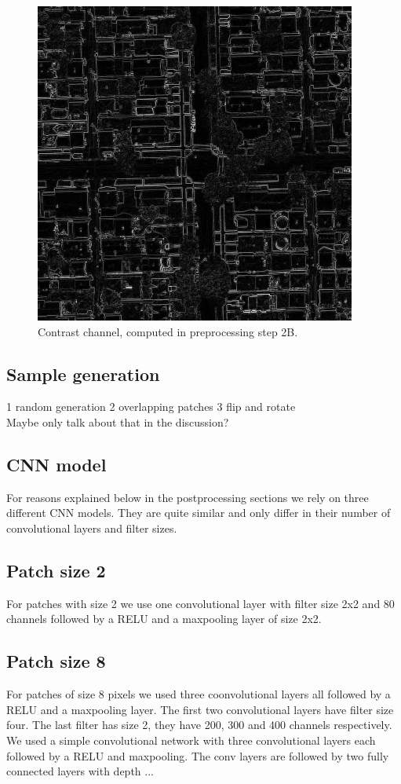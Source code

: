 \documentclass[10pt,conference,compsocconf]{IEEEtran}
\begin{document}
\begin{figure}
	\centering
	\includegraphics[width=.5\columnwidth]{pictures/preproc2}
	\caption{Contrast channel, computed in preprocessing step 2B.}
	\label{fig:preproc_simple}
\end{figure}

\subsection{Sample generation}
1 random generation
2 overlapping patches
3 flip and rotate\\
Maybe only talk about that in the discussion?

\subsection{CNN model}
For reasons explained below in the postprocessing sections we rely on three different CNN models. They are quite similar and only differ in their number of convolutional layers and filter sizes. 
\subsection{Patch size 2}
	For patches with size 2 we use one convolutional layer with filter size 2x2 and 80 channels followed by a RELU and a maxpooling layer of size 2x2. 
\subsection{Patch size 8}
	For patches of size 8 pixels we used three coonvolutional layers all followed by a RELU and a maxpooling layer. The first two convolutional layers have filter size four. The last filter has size 2, they have 200, 300 and 400 channels respectively. 
We used a simple convolutional network with three convolutional layers each followed by a RELU and maxpooling. The conv layers are followed by two fully connected layers with depth
...
\end{document}
